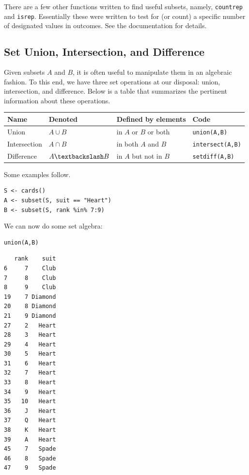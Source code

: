 \documentclass[captions=tableheading]{scrbook}
\begin{document}
There are a few other functions written to find useful subsets, namely, \texttt{countrep} and \texttt{isrep}. Essentially these were written to test for (or count) a specific number of designated values in outcomes. See the documentation for details.
\subsection{Set Union, Intersection, and Difference}
\label{sec-4-2-2}


Given subsets \(A\) and \(B\), it is often useful to manipulate them in an algebraic fashion. To this end, we have three set operations at our disposal: union, intersection, and difference. Below is a table that summarizes the pertinent information about these operations.


\begin{center}
\begin{tabular}{llll}
\hline
 Name          &  Denoted                &  Defined by elements        &  Code                     \\
\hline
 Union         &  \(A\cup B\)            &  in \(A\) or \(B\) or both  &  \texttt{union(A,B)}      \\
 Intersection  &  \(A\cap B\)            &  in both \(A\) and \(B\)    &  \texttt{intersect(A,B)}  \\
 Difference    &  \(A\textbackslash B\)  &  in \(A\) but not in \(B\)  &  \texttt{setdiff(A,B)}    \\
\hline
\end{tabular}
\end{center}




Some examples follow. 


\begin{verbatim}
S <- cards() 
A <- subset(S, suit == "Heart") 
B <- subset(S, rank %in% 7:9)
\end{verbatim}

We can now do some set algebra: 


\begin{verbatim}
union(A,B)
\end{verbatim}


\begin{verbatim}
   rank    suit
6     7    Club
7     8    Club
8     9    Club
19    7 Diamond
20    8 Diamond
21    9 Diamond
27    2   Heart
28    3   Heart
29    4   Heart
30    5   Heart
31    6   Heart
32    7   Heart
33    8   Heart
34    9   Heart
35   10   Heart
36    J   Heart
37    Q   Heart
38    K   Heart
39    A   Heart
45    7   Spade
46    8   Spade
47    9   Spade
\end{verbatim}
\end{document}
